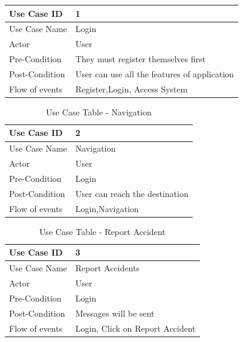 \documentclass{article}
\begin{document}
\begin{flushleft}
\begin{enumerate}
\begin{center}
\begin{table}[!ht]
\begin{tabular}{ | m{7em} | m{7cm} | }
            \hline
             Use Case ID & 1  \\ \hline
             Use Case Name & Login  \\  \hline
             Actor & User   \\  \hline
            Pre-Condition & They must register themselves first \\ \hline
            Post-Condition & User can use all the features of application\\ \hline
            Flow of events & Register,Login, Access System   \\ \hline
            
            \end{tabular}
           \end{table}
            \begin{table}[!ht]
           \renewcommand\thetable{4.2.2}
               \centering
               \caption{Use Case Table - Navigation}
               \label{""   ""}
              \begin{tabular}{ | m{7em} | m{7cm} | }
           
            \hline
             Use Case ID & 2  \\ \hline
             Use Case Name & Navigation  \\  \hline
             Actor & User   \\  \hline
            Pre-Condition & Login \\ \hline
            Post-Condition & User can reach the destination\\ \hline
            Flow of events & Login,Navigation  \\ \hline
            
            \end{tabular}
           \end{table}
            
            
            
            \begin{table}[!ht]
           \renewcommand\thetable{4.2.3}
               \centering
               \caption{Use Case Table - Report Accident}
               \label{"""  "}
              \begin{tabular}{ | m{7em} | m{7cm} | }
           
            \hline
             Use Case ID & 3 \\ \hline
             Use Case Name & Report Accidents \\  \hline
             Actor & User   \\  \hline
            Pre-Condition & Login \\ \hline
            Post-Condition & Messages will be sent \\ \hline
            Flow of events & Login, Click on Report Accident   \\ \hline
            

\end{tabular}
\end{table}
\end{center}
\end{enumerate}
\end{flushleft}
\end{document}
